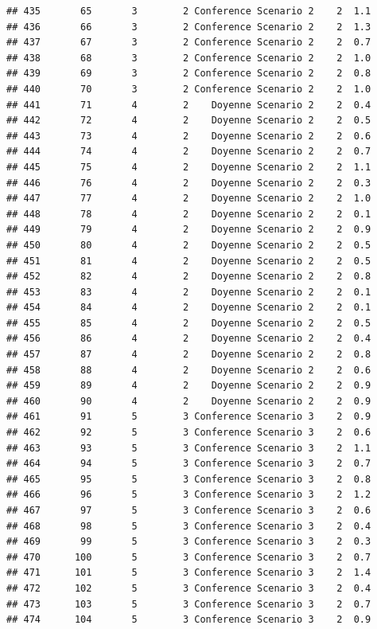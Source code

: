 \documentclass[
]{article}
\begin{document}
\begin{verbatim}
## 435       65       3        2 Conference Scenario 2    2  1.1
## 436       66       3        2 Conference Scenario 2    2  1.3
## 437       67       3        2 Conference Scenario 2    2  0.7
## 438       68       3        2 Conference Scenario 2    2  1.0
## 439       69       3        2 Conference Scenario 2    2  0.8
## 440       70       3        2 Conference Scenario 2    2  1.0
## 441       71       4        2    Doyenne Scenario 2    2  0.4
## 442       72       4        2    Doyenne Scenario 2    2  0.5
## 443       73       4        2    Doyenne Scenario 2    2  0.6
## 444       74       4        2    Doyenne Scenario 2    2  0.7
## 445       75       4        2    Doyenne Scenario 2    2  1.1
## 446       76       4        2    Doyenne Scenario 2    2  0.3
## 447       77       4        2    Doyenne Scenario 2    2  1.0
## 448       78       4        2    Doyenne Scenario 2    2  0.1
## 449       79       4        2    Doyenne Scenario 2    2  0.9
## 450       80       4        2    Doyenne Scenario 2    2  0.5
## 451       81       4        2    Doyenne Scenario 2    2  0.5
## 452       82       4        2    Doyenne Scenario 2    2  0.8
## 453       83       4        2    Doyenne Scenario 2    2  0.1
## 454       84       4        2    Doyenne Scenario 2    2  0.1
## 455       85       4        2    Doyenne Scenario 2    2  0.5
## 456       86       4        2    Doyenne Scenario 2    2  0.4
## 457       87       4        2    Doyenne Scenario 2    2  0.8
## 458       88       4        2    Doyenne Scenario 2    2  0.6
## 459       89       4        2    Doyenne Scenario 2    2  0.9
## 460       90       4        2    Doyenne Scenario 2    2  0.9
## 461       91       5        3 Conference Scenario 3    2  0.9
## 462       92       5        3 Conference Scenario 3    2  0.6
## 463       93       5        3 Conference Scenario 3    2  1.1
## 464       94       5        3 Conference Scenario 3    2  0.7
## 465       95       5        3 Conference Scenario 3    2  0.8
## 466       96       5        3 Conference Scenario 3    2  1.2
## 467       97       5        3 Conference Scenario 3    2  0.6
## 468       98       5        3 Conference Scenario 3    2  0.4
## 469       99       5        3 Conference Scenario 3    2  0.3
## 470      100       5        3 Conference Scenario 3    2  0.7
## 471      101       5        3 Conference Scenario 3    2  1.4
## 472      102       5        3 Conference Scenario 3    2  0.4
## 473      103       5        3 Conference Scenario 3    2  0.7
## 474      104       5        3 Conference Scenario 3    2  0.9

\end{verbatim}
\end{document}
